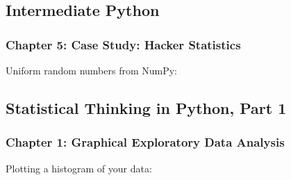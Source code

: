 \documentclass[letterpaper,10pt,english]{sphinxmanual}
\begin{document}
\subsection{Intermediate Python}
\label{\detokenize{big-cheat-sheet:intermediate-python}}

\subsubsection{Chapter 5: Case Study: Hacker Statistics}
\label{\detokenize{big-cheat-sheet:chapter-5-case-study-hacker-statistics}}
Uniform random numbers from NumPy:

\begin{sphinxVerbatim}[commandchars=\\\{\}]
    
          \PYG{c+c1}{\PYGZsh{} uniform random in [0,1)}
    
\end{sphinxVerbatim}


\subsection{Statistical Thinking in Python, Part 1}
\label{\detokenize{big-cheat-sheet:statistical-thinking-in-python-part-1}}

\subsubsection{Chapter 1: Graphical Exploratory Data Analysis}
\label{\detokenize{big-cheat-sheet:chapter-1-graphical-exploratory-data-analysis}}
Plotting a histogram of your data:

\begin{sphinxVerbatim}[commandchars=\\\{\}]
   
 \PYG{p}{[}\PYG{p}{]} 
  
  
\end{sphinxVerbatim}
\end{document}
